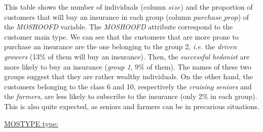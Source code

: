 \documentclass[
  12pt,
  oneside]{report}
\newenvironment{Shaded}{\begin{snugshade}}{\end{snugshade}}
\newcommand{\CommentTok}[1]{\textcolor[rgb]{0.56,0.35,0.01}{\textit{#1}}}
\newcommand{\DataTypeTok}[1]{\textcolor[rgb]{0.13,0.29,0.53}{#1}}
\newcommand{\DecValTok}[1]{\textcolor[rgb]{0.00,0.00,0.81}{#1}}
\newcommand{\KeywordTok}[1]{\textcolor[rgb]{0.13,0.29,0.53}{\textbf{#1}}}
\newcommand{\NormalTok}[1]{#1}
\newcommand{\OperatorTok}[1]{\textcolor[rgb]{0.81,0.36,0.00}{\textbf{#1}}}
\newcommand{\StringTok}[1]{\textcolor[rgb]{0.31,0.60,0.02}{#1}}
\begin{document}
This table shows the number of individuals (column \(size\)) and the proportion of customers that will buy an insurance in each group (column \(purchase\_prop\)) of the \emph{MOSHOOFD} variable. The \emph{MOSHOOFD} attribute correspond to the customer main type. We can see that the customers that are more prone to purchase an insurance are the one belonging to the group 2, \emph{i.e.} the \emph{driven growers} (13\% of them will buy an insurance). Then, the \emph{successful hedonist} are more likely to buy an insurance (\emph{group 1}, \(9\%\) of them). The names of these two groups suggest that they are rather wealthy individuals. On the other hand, the customers belonging to the class 6 and 10, respectively the \emph{cruising seniors} and the \emph{farmers}, are less likely to subscribe to the insurance (only 2\% in each group). This is also quite expected, as seniors and farmers can be in precarious situations.

\underline{MOSTYPE type:}

\begin{Shaded}
\end{Shaded}
\end{document}
